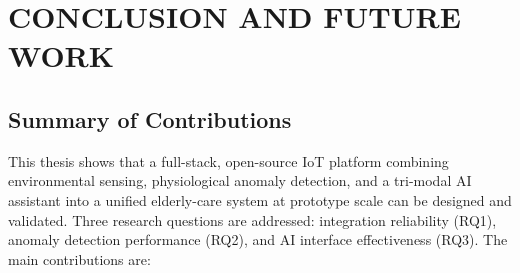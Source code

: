 \chapter{CONCLUSION AND FUTURE WORK}

\section{Summary of Contributions}

This thesis shows that a full-stack, open-source IoT platform combining environmental sensing, physiological anomaly detection, and a tri-modal AI assistant into a unified elderly-care system at prototype scale can be designed and validated. Three research questions are addressed: integration reliability (RQ1), anomaly detection performance (RQ2), and AI interface effectiveness (RQ3). The main contributions are:


